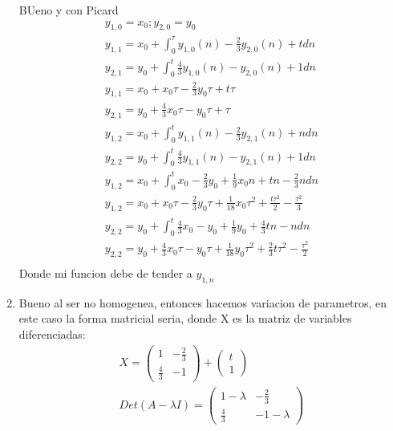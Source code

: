 \begin{mdframed}
\begin{enumerate}
{        BUeno y con Picard
        \begin{gather*}
            y_{1,0}=x_0;
            y_{2,0}=y_0\\
            y_{1,1}=x_0+\int_{0}^{\tau}y_{1,0}(n)-\frac{2}{3}y_{2,0}(n)+tdn\\
            y_{2,1}=y_0+\int_{0}^{t}\frac{4}{3}y_{1,0}(n)-y_{2,0}(n)+1dn\\
            y_{1,1}= x_0+x_0\tau-\frac{2}{3}y_0\tau+t\tau\\
            y_{2,1}= y_0+\frac{4}{3}x_0\tau-y_0\tau+\tau\\
            y_{1,2}=x_0+\int_{0}^{t}y_{1,1}(n)-\frac{2}{3}y_{2,1}(n)+ndn\\
            y_{2,2}=y_0+\int_{0}^{t}\frac{4}{3}y_{1,1}(n)-y_{2,1}(n)+1dn\\
            y_{1,2}=x_0+\int_{0}^{t}x_0-\frac{2}{3}y_0+\frac{1}{9}x_0n+tn-\frac{2}{3}n dn\\
            y_{1,2}=x_0+x_0\tau-\frac{2}{3}y_0\tau+\frac{1}{18}x_0\tau^2+\frac{t \tau^2}{2}-\frac{\tau^2}{3}\\
            y_{2,2}=y_0+\int_{0}^{t}\frac{4}{3}x_0-y_0+\frac{1}{9}y_0+\frac{4}{3}tn-ndn\\
            y_{2,2}=y_0+\frac{4}{3}x_0\tau-y_0\tau+\frac{1}{18}y_0\tau^2+\frac{2}{3}t\tau^2-\frac{\tau^2}{2}\\
        \end{gather*}
        Donde mi funcion debe de tender a $y_{1, n}$
    }
       \item {
       Bueno al ser no homogenea, entonces hacemos variacion de parametros, en este caso la forma matricial seria, donde X es la matriz de variables diferenciadas:
        \begin{gather*}
            X = 
                \begin{pmatrix}
                1 & -\frac{2}{3}\\
                \frac{4}{3} & -1 
                \end{pmatrix}
            +  \begin{pmatrix}
                t \\
                1 
                \end{pmatrix}\\
            Det(A-\lambda I) = 
                \begin{pmatrix}
                1 -\lambda& -\frac{2}{3}\\
                \frac{4}{3} & -1-\lambda 
                \end{pmatrix}\\

\end{gather*}}
\end{enumerate}
\end{mdframed}
